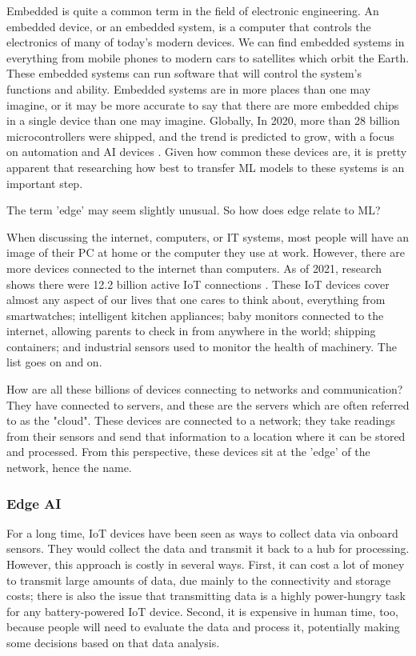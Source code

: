 \documentclass[conference]{IEEEtran}
\begin{document}
Embedded is quite a common term in the field of electronic engineering. An embedded device, or an embedded system, is a computer that controls the electronics of many of today's modern devices. We can find embedded systems in everything from mobile phones to modern cars to satellites which orbit the Earth. These embedded systems can run software that will control the system's functions and ability.
Embedded systems are in more places than one may imagine, or it may be more accurate to say that there are more embedded chips in a single device than one may imagine. Globally, In 2020, more than 28 billion microcontrollers were shipped, and the trend is predicted to grow, with a focus on automation and AI devices \cite{ucmarket}. Given how common these devices are, it is pretty apparent that researching how best to transfer ML models to these systems is an important step.

The term 'edge' may seem slightly unusual. So how does edge relate to ML? 

When discussing the internet, computers, or IT systems, most people will have an image of their PC at home or the computer they use at work. However, there are more devices connected to the internet than computers. As of 2021, research shows there were 12.2 billion active IoT connections \cite{ucmarket}. These IoT devices cover almost any aspect of our lives that one cares to think about, everything from smartwatches; intelligent kitchen appliances; baby monitors connected to the internet, allowing parents to check in from anywhere in the world; shipping containers; and industrial sensors used to monitor the health of machinery. The list goes on and on.

How are all these billions of devices connecting to networks and communication? They have connected to servers, and these are the servers which are often referred to as the "cloud".
These devices are connected to a network; they take readings from their sensors and send that information to a location where it can be stored and processed. From this perspective, these devices sit at the 'edge' of the network, hence the name.

\subsubsection{Edge AI}
For a long time, IoT devices have been seen as ways to collect data via onboard sensors. They would collect the data and transmit it back to a hub for processing. However, this approach is costly in several ways. First, it can cost a lot of money to transmit large amounts of data, due mainly to the connectivity and storage costs; there is also the issue that transmitting data is a highly power-hungry task for any battery-powered IoT device. Second, it is expensive in human time, too, because people will need to evaluate the data and process it, potentially making some decisions based on that data analysis.
\end{document}
